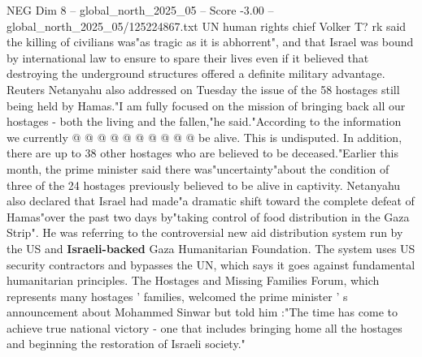 \begin{textsample}{NEG Dim 8 – global\_north\_2025\_05 – Score -3.00 – global\_north\_2025\_05/125224867.txt}
UN human rights chief Volker T? rk said the killing of civilians was"as tragic as it is abhorrent", and that Israel was bound by international law to ensure to spare their lives even if it believed that destroying the underground structures offered a definite military advantage.
Reuters Netanyahu also addressed on Tuesday the issue of the 58 hostages still being held by Hamas."I am fully focused on the mission of bringing back all our hostages - both the living and the fallen,"he said."According to the information we currently @ @ @ @ @ @ @ @ @ @ be alive.
This is undisputed.
In addition, there are up to 38 other hostages who are believed to be deceased."Earlier this month, the prime minister said there was"uncertainty"about the condition of three of the 24 hostages previously believed to be alive in captivity.
Netanyahu also declared that Israel had made"a dramatic shift toward the complete defeat of Hamas"over the past two days by"taking control of food distribution in the Gaza Strip".
He was referring to the controversial new aid distribution system run by the US and \textbf{Israeli-backed} Gaza Humanitarian Foundation.
The system uses US security contractors and bypasses the UN, which says it goes against fundamental humanitarian principles.
The Hostages and Missing Families Forum, which represents many hostages ' families, welcomed the prime minister ' s announcement about Mohammed Sinwar but told him :"The time has come to achieve true national victory - one that includes bringing home all the hostages and beginning the restoration of Israeli society."

\end{textsample}
